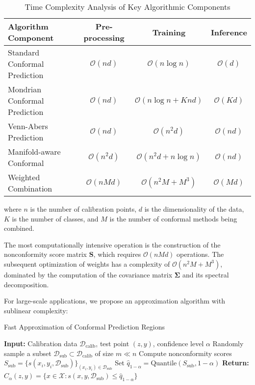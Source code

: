 \documentclass{article}
\theoremstyle{plain}
\theoremstyle{definition}
\theoremstyle{remark}
\begin{document}
\begin{table}[htbp]
\centering
\caption{Time Complexity Analysis of Key Algorithmic Components}
\label{tab:time_complexity}
\begin{tabular}{|l|c|c|c|}
\hline
\textbf{Algorithm Component} & \textbf{Pre-processing} & \textbf{Training} & \textbf{Inference} \\
\hline
Standard Conformal Prediction & $\mathcal{O}(nd)$ & $\mathcal{O}(n \log n)$ & $\mathcal{O}(d)$ \\
\hline
Mondrian Conformal Prediction & $\mathcal{O}(nd)$ & $\mathcal{O}(n \log n + Knd)$ & $\mathcal{O}(Kd)$ \\
\hline
Venn-Abers Prediction & $\mathcal{O}(nd)$ & $\mathcal{O}(n^2d)$ & $\mathcal{O}(nd)$ \\
\hline
Manifold-aware Conformal & $\mathcal{O}(n^2d)$ & $\mathcal{O}(n^2d + n \log n)$ & $\mathcal{O}(nd)$ \\
\hline
Weighted Combination & $\mathcal{O}(nMd)$ & $\mathcal{O}(n^2M + M^3)$ & $\mathcal{O}(Md)$ \\
\hline
\end{tabular}
\end{table}

where $n$ is the number of calibration points, $d$ is the dimensionality of the data, $K$ is the number of classes, and $M$ is the number of conformal methods being combined.

The most computationally intensive operation is the construction of the nonconformity score matrix $\mathbf{S}$, which requires $\mathcal{O}(nMd)$ operations. The subsequent optimization of weights has a complexity of $\mathcal{O}(n^2M + M^3)$, dominated by the computation of the covariance matrix $\mathbf{\Sigma}$ and its spectral decomposition.

For large-scale applications, we propose an approximation algorithm with sublinear complexity:

\begin{algorithm}
\caption{Fast Approximation of Conformal Prediction Regions}
\begin{algorithmic}[1]
\State \textbf{Input:} Calibration data $\mathcal{D}_{\text{calib}}$, test point $(z, y)$, confidence level $\alpha$
\State Randomly sample a subset $\mathcal{D}_{\text{sub}} \subset \mathcal{D}_{\text{calib}}$ of size $m \ll n$
\State Compute nonconformity scores $S_{\text{sub}} = \{s(x_i, y_i, \mathcal{D}_{\text{sub}})\}_{(x_i, y_i) \in \mathcal{D}_{\text{sub}}}$
\State Set $\hat{q}_{1-\alpha} = \text{Quantile}(S_{\text{sub}}, 1-\alpha)$
\State \textbf{Return:} $\hat{C}_{\alpha}(z, y) = \{x \in \mathcal{X}: s(x, y, \mathcal{D}_{\text{sub}}) \leq \hat{q}_{1-\alpha}\}$
\end{algorithmic}
\end{algorithm}
\end{document}
